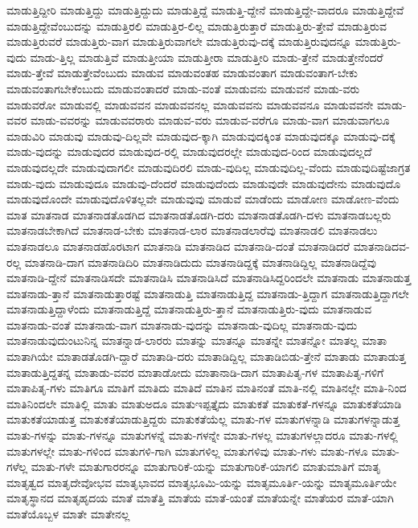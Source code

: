 {ಮಾಡುತ್ತಿದ್ದೀರಿ
ಮಾಡುತ್ತಿದ್ದು
ಮಾಡುತ್ತಿದ್ದುದು
ಮಾಡುತ್ತಿದ್ದೆ
ಮಾಡುತ್ತಿ-ದ್ದೇನೆ
ಮಾಡುತ್ತಿದ್ದೇ-ವಾದರೂ
ಮಾಡುತ್ತಿದ್ದೇವೆ
ಮಾಡುತ್ತಿದ್ದೇವೆಂಬುದನ್ನು
ಮಾಡುತ್ತಿರಲಿ
ಮಾಡುತ್ತಿರ-ಲಿಲ್ಲ
ಮಾಡುತ್ತಿರುತ್ತಾರೆ
ಮಾಡುತ್ತಿರು-ತ್ತೇವೆ
ಮಾಡುತ್ತಿರುವ
ಮಾಡುತ್ತಿರುವರೆ
ಮಾಡುತ್ತಿರು-ವಾಗ
ಮಾಡುತ್ತಿರುವಾಗಲೇ
ಮಾಡುತ್ತಿರುವು-ದಕ್ಕೆ
ಮಾಡುತ್ತಿರುವುದನ್ನೂ
ಮಾಡುತ್ತಿರು-ವುದು
ಮಾಡು-ತ್ತಿಲ್ಲ
ಮಾಡುತ್ತಿವೆ
ಮಾಡುತ್ತೀಯಾ
ಮಾಡುತ್ತೀರಾ
ಮಾಡುತ್ತೀರಿ
ಮಾಡು-ತ್ತೇನೆ
ಮಾಡುತ್ತೇನೆಂದರೆ
ಮಾಡು-ತ್ತೇವೆ
ಮಾಡುತ್ತೇವೆಂಬುದು
ಮಾಡುವ
ಮಾಡುವಂತಹ
ಮಾಡುವಂತಾಗ
ಮಾಡುವಂತಾಗ-ಬೇಕು
ಮಾಡುವಂತಾಗಬೇಕೆಂಬುದು
ಮಾಡುವಂತಾದರೆ
ಮಾಡು-ವಂತೆ
ಮಾಡುವನು
ಮಾಡುವನೆ
ಮಾಡು-ವರು
ಮಾಡುವರೋ
ಮಾಡುವಲ್ಲಿ
ಮಾಡುವವನ
ಮಾಡುವವನಲ್ಲ
ಮಾಡುವವನು
ಮಾಡುವವನೂ
ಮಾಡುವವನೇ
ಮಾಡು-ವವರ
ಮಾಡು-ವವರನ್ನು
ಮಾಡುವವರಾರು
ಮಾಡುವ-ವರು
ಮಾಡುವ-ವರೆಗೂ
ಮಾಡು-ವಾಗ
ಮಾಡುವಾಗಲೂ
ಮಾಡುವಿರಿ
ಮಾಡುವು
ಮಾಡುವು-ದಿಲ್ಲವೇ
ಮಾಡುವುದ-ಕ್ಕಾಗಿ
ಮಾಡುವುದಕ್ಕಿಂತ
ಮಾಡುವುದಕ್ಕೂ
ಮಾಡುವು-ದಕ್ಕೆ
ಮಾಡು-ವುದನ್ನು
ಮಾಡುವುದರ
ಮಾಡುವುದ-ರಲ್ಲಿ
ಮಾಡುವುದರಲ್ಲೇ
ಮಾಡುವುದ-ರಿಂದ
ಮಾಡುವುದಲ್ಲದೆ
ಮಾಡುವುದಲ್ಲದೇ
ಮಾಡುವುದಾಗಲೀ
ಮಾಡುವುದಿರಲಿ
ಮಾಡು-ವುದಿಲ್ಲ
ಮಾಡುವುದಿಲ್ಲ-ವೆಂದು
ಮಾಡುವುದಿಷ್ಟೆಜಾಗ್ರತ
ಮಾಡು-ವುದು
ಮಾಡುವುದೂ
ಮಾಡುವು-ದೆಂದರೆ
ಮಾಡುವುದೆಂದು
ಮಾಡುವುದೇ
ಮಾಡುವುದೇನು
ಮಾಡುವುದೊ
ಮಾಡುವುದೊಂದೇ
ಮಾಡುವುದೊಳಿತಲ್ಲವೇ
ಮಾಡುವುವು
ಮಾಡುವೆ
ಮಾಡೆಂದು
ಮಾಡೋಣ
ಮಾಡೋಣ-ವೆಂದು
ಮಾತ
ಮಾತನಾಡ
ಮಾತನಾಡತೊಡಗಿದ
ಮಾತನಾಡತೊಡಗಿ-ದರು
ಮಾತನಾಡತೊಡಗಿ-ದಳು
ಮಾತನಾಡಬಲ್ಲರು
ಮಾತನಾಡಬೇಕಾಗಿದೆ
ಮಾತನಾಡ-ಬೇಕು
ಮಾತನಾಡ-ಲಾರ
ಮಾತನಾಡಲಾರೆವು
ಮಾತನಾಡಲಿ
ಮಾತನಾಡಲು
ಮಾತನಾಡಲೂ
ಮಾತನಾಡಹೊರಟಾಗ
ಮಾತನಾಡಿ
ಮಾತನಾಡಿದ
ಮಾತನಾಡಿ-ದಂತೆ
ಮಾತನಾಡಿದರೆ
ಮಾತನಾಡಿದವ-ರಲ್ಲ
ಮಾತನಾಡಿ-ದಾಗ
ಮಾತನಾಡಿದಿರಿ
ಮಾತನಾಡಿದುದು
ಮಾತನಾಡಿದ್ದಕ್ಕೆ
ಮಾತನಾಡಿದ್ದಿಲ್ಲ
ಮಾತನಾಡಿದ್ದೆವು
ಮಾತನಾಡಿ-ದ್ದೇನೆ
ಮಾತನಾಡಿಸದೇ
ಮಾತನಾಡಿಸಿ
ಮಾತನಾಡಿಸಿದೆ
ಮಾತನಾಡಿಸಿದ್ದರಿಂದಲೇ
ಮಾತನಾಡು
ಮಾತನಾಡುತ್ತ
ಮಾತನಾಡು-ತ್ತಾನೆ
ಮಾತನಾಡುತ್ತಾರಷ್ಟೆ
ಮಾತನಾಡುತ್ತಿ
ಮಾತನಾಡುತ್ತಿದ್ದ
ಮಾತನಾಡು-ತ್ತಿದ್ದಾಗ
ಮಾತನಾಡುತ್ತಿದ್ದಾಗಲೇ
ಮಾತನಾಡುತ್ತಿದ್ದಾಳೆಂದು
ಮಾತನಾಡುತ್ತಿದ್ದೆ
ಮಾತನಾಡುತ್ತಿರು-ತ್ತಾನೆ
ಮಾತನಾಡುತ್ತಿರು-ವುದು
ಮಾತನಾಡುವ
ಮಾತನಾಡು-ವಂತೆ
ಮಾತನಾಡು-ವಾಗ
ಮಾತನಾಡು-ವುದನ್ನು
ಮಾತನಾಡು-ವುದಿಲ್ಲ
ಮಾತನಾಡು-ವುದು
ಮಾತನಾಡುವುದುಂಟುನಿನ್ನ
ಮಾತನ್ನಾಡ-ಲಾರರು
ಮಾತನ್ನು
ಮಾತನ್ನೂ
ಮಾತನ್ನೇ
ಮಾತನ್ನೋ
ಮಾತಲ್ಲ
ಮಾತಾ
ಮಾತಾಗಿಯೇ
ಮಾತಾಡತೊಡಗಿ-ದ್ದಾರೆ
ಮಾತಾಡಿ-ದರು
ಮಾತಾಡಿದ್ದಿಲ್ಲ
ಮಾತಾಡಿಬಿಡು-ತ್ತೇನೆ
ಮಾತಾಡು
ಮಾತಾಡುತ್ತ
ಮಾತಾಡುತ್ತಿದ್ದತನ್ನ
ಮಾತಾಡು-ವವರ
ಮಾತಾಡೋದು
ಮಾತಾನಾಡಿ-ದಾಗ
ಮಾತಾಪಿತೃ-ಗಳ
ಮಾತಾಪಿತೃ-ಗಳಿಗೆ
ಮಾತಾಪಿತೃ-ಗಳು
ಮಾತಿಗೂ
ಮಾತಿಗೆ
ಮಾತಿದು
ಮಾತಿದೆ
ಮಾತಿನ
ಮಾತಿನಂತೆ
ಮಾತಿ-ನಲ್ಲಿ
ಮಾತಿನಲ್ಲೇ
ಮಾತಿ-ನಿಂದ
ಮಾತಿನಿಂದಲೇ
ಮಾತಿಲ್ಲಿ
ಮಾತು
ಮಾತುಅದೂ
ಮಾತುಇಪ್ಪತ್ತೈದು
ಮಾತುಕತೆ
ಮಾತುಕತೆ-ಗಳನ್ನೂ
ಮಾತುಕತೆಯಾಡಿ
ಮಾತುಕತೆಯಾಡುತ್ತ
ಮಾತುಕತೆಯಾಡುತ್ತಿದ್ದರು
ಮಾತುಕತೆಯೆಲ್ಲ
ಮಾತು-ಗಳ
ಮಾತುಗಳನ್ನಾಡಿ
ಮಾತುಗಳನ್ನಾಡುತ್ತ
ಮಾತು-ಗಳನ್ನು
ಮಾತು-ಗಳನ್ನೂ
ಮಾತುಗಳನ್ನೆ
ಮಾತು-ಗಳನ್ನೇ
ಮಾತು-ಗಳಲ್ಲ
ಮಾತುಗಳಲ್ಲಾದರೂ
ಮಾತು-ಗಳಲ್ಲಿ
ಮಾತುಗಳಲ್ಲೇ
ಮಾತು-ಗಳಿಂದ
ಮಾತುಗಳಿ-ಗಾಗಿ
ಮಾತುಗಳಿಲ್ಲ
ಮಾತುಗಳಿವು
ಮಾತು-ಗಳು
ಮಾತು-ಗಳೂ
ಮಾತು-ಗಳೆಲ್ಲ
ಮಾತು-ಗಳೇ
ಮಾತುಗಾರರನ್ನೂ
ಮಾತುಗಾರಿಕೆ-ಯನ್ನು
ಮಾತುಗಾರಿಕೆ-ಯಾಗಲಿ
ಮಾತುಮಾತಿಗೆ
ಮಾತೃ
ಮಾತೃತ್ವದ
ಮಾತೃದೇವೋಭವ
ಮಾತೃಭಾವದ
ಮಾತೃಭೂಮಿ-ಯನ್ನು
ಮಾತೃಮೂರ್ತಿ-ಯನ್ನು
ಮಾತೃಮೂರ್ತಿಯೇ
ಮಾತೃಸ್ಥಾನದ
ಮಾತೃಹೃದಯ
ಮಾತೆ
ಮಾತೆತ್ತಿ
ಮಾತೆಯ
ಮಾತೆ-ಯಂತೆ
ಮಾತೆಯನ್ನೇ
ಮಾತೆಯರ
ಮಾತೆ-ಯಾಗಿ
ಮಾತೆಯೊಬ್ಬಳ
ಮಾತೇ
ಮಾತೇನಲ್ಲ
}
